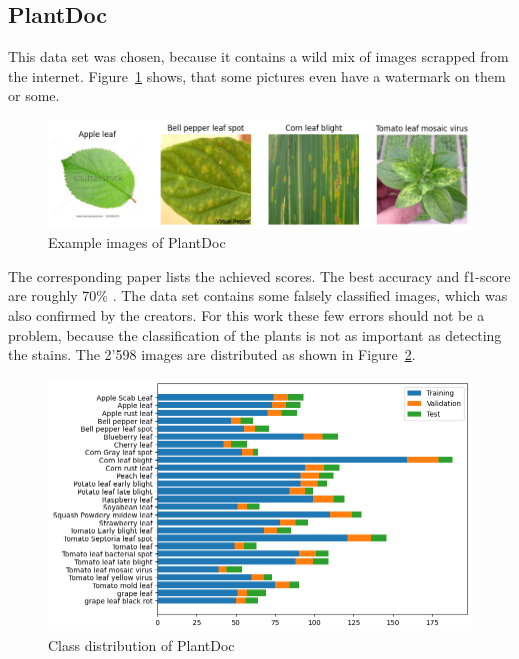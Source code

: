 \subsection{PlantDoc}
This data set was chosen, because it contains a wild mix of images scrapped from the internet. Figure~\ref{fig:example_images_of_plantdoc} shows, that some pictures even have a watermark on them or some.
\begin{figure}[H]
    \begin{center}
    \includegraphics[width=15cm]{../images/example_images_of_plantdoc.png}
    \caption{Example images of PlantDoc}\label{fig:example_images_of_plantdoc}
    \end{center}
\end{figure}
The corresponding paper lists the achieved scores. The best accuracy and f1-score are roughly 70\% \autocite{singh2020}. The data set contains some falsely classified images, which was also confirmed by the creators. For this work these few errors should not be a problem, because the classification of the plants is not as important as detecting the stains.
The 2'598 images are distributed as shown in Figure~\ref{fig:class_distribution_of_plantdoc}.

\begin{figure}[H]
    \begin{center}
    \includegraphics[width=15cm]{../images/class_distribution_of_plantdoc.png}
    \caption{Class distribution of PlantDoc}\label{fig:class_distribution_of_plantdoc}
    \end{center}
\end{figure}

